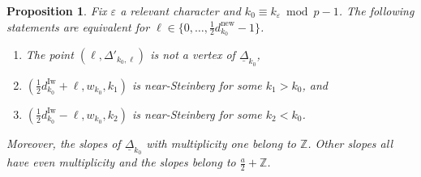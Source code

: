 \documentclass[12pt]{amsart}
\newtheorem{proposition}[subsection]{Proposition}
\theoremstyle{definition}
\numberwithin{equation}{subsection}
\def\ZZ{\mathbb{Z}}
\newcommand{\new}{\mathrm{new}}
\newcommand{\Iw}{\mathrm{Iw}}
\begin{document}
\begin{proposition}
\label{P:vertices of Deltak}
Fix $\varepsilon$ a relevant character and $k_0 \equiv k_\varepsilon \bmod p-1$.
The following statements are equivalent for $\ell \in\{0, \dots, \frac12d_{k_0}^\new-1\}$.
\begin{enumerate}
\item 
The point $(\ell, \Delta'_{{k_0},\ell})$ is not a vertex of $\underline \Delta_{k_0}$,
\item $(\frac 12d_{k_0}^\Iw + \ell, w_{k_0}, k_1)$ is near-Steinberg for some  $k_1 > {k_0}$, and
\item 
$(\frac 12d_{k_0}^\Iw - \ell, w_{k_0}, k_2)$ is near-Steinberg for some  $k_2 < {k_0}$.
\end{enumerate}
Moreover, the slopes of $\underline \Delta_{k_0}$ with multiplicity one belong to $\ZZ$. Other slopes all have even multiplicity and the slopes belong to $\frac a2 + \ZZ$.
\end{proposition}
\end{document}
